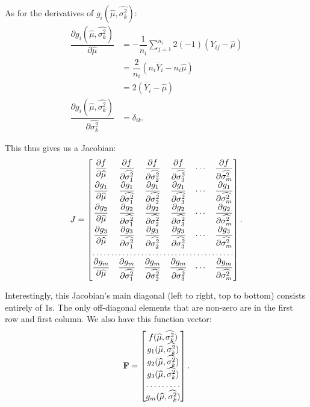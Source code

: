 \documentclass[12pt,a4paper]{article}
\newcommand{\ovY}{\overline{Y}}
\newcommand{\wmu}{\widehat{\mu}}
\newcommand{\wst}[1]{\widehat{\sigma^2_{#1}}}
\begin{document}
	As for the derivatives of $g_i(\wmu, \wst{k})$:
	\begin{align*}
		\dfrac{\partial g_i(\wmu, \wst{k})}{\partial \wmu} &= -\dfrac{1}{n_i} \sum_{j=1}^{n_i} 2(-1)(Y_{ij}-\wmu) \\
		&= \dfrac{2}{n_i} (n_i\ovY_i - n_i\wmu) \\
		&= 2(\ovY_i-\wmu) \\
		\dfrac{\partial g_i(\wmu, \wst{k})}{\partial \wst{k}} &= \delta_{ik}.
	\end{align*}

	This thus gives us a Jacobian:
	\begin{align*}
		J = \left[\begin{matrix}
			\dfrac{\partial f}{\partial \wmu} & \dfrac{\partial f}{\partial \wst{1}} & \dfrac{\partial f}{\partial \wst{2}} & \dfrac{\partial f}{\partial \wst{3}} & \cdots & \dfrac{\partial f}{\partial \wst{m}} \\
			\dfrac{\partial g_1}{\partial \wmu} & \dfrac{\partial g_1}{\partial \wst{1}} & \dfrac{\partial g_1}{\partial \wst{2}} & \dfrac{\partial g_1}{\partial \wst{3}} & \cdots & \dfrac{\partial g_1}{\partial \wst{m}} \\
			\dfrac{\partial g_2}{\partial \wmu} & \dfrac{\partial g_2}{\partial \wst{1}} & \dfrac{\partial g_2}{\partial \wst{2}} & \dfrac{\partial g_2}{\partial \wst{3}} & \cdots & \dfrac{\partial g_2}{\partial \wst{m}} \\
			\dfrac{\partial g_3}{\partial \wmu} & \dfrac{\partial g_3}{\partial \wst{1}} & \dfrac{\partial g_3}{\partial \wst{2}} & \dfrac{\partial g_3}{\partial \wst{3}} & \cdots & \dfrac{\partial g_3}{\partial \wst{m}} \\
			\hdotsfor{6} \\
			\dfrac{\partial g_m}{\partial \wmu} & \dfrac{\partial g_m}{\partial \wst{1}} & \dfrac{\partial g_m}{\partial \wst{2}} & \dfrac{\partial g_m}{\partial \wst{3}} & \cdots & \dfrac{\partial g_m}{\partial \wst{m}}
		\end{matrix}\right].
	\end{align*}

	Interestingly, this Jacobian's main diagonal (left to right, top to bottom) consists entirely of 1s. The only off-diagonal elements that are non-zero are in the first row and first column. We also have this function vector:
	\begin{align*}
		\mathbf{F} = \left[
		\begin{matrix}
			f(\wmu, \wst{k}) \\
			g_1(\wmu, \wst{k}) \\
			g_2(\wmu, \wst{k}) \\
			g_3(\wmu, \wst{k}) \\
			\hdotsfor{1} \\
			g_m(\wmu, \wst{k})
		\end{matrix}
	\right].
	\end{align*}
\end{document}
